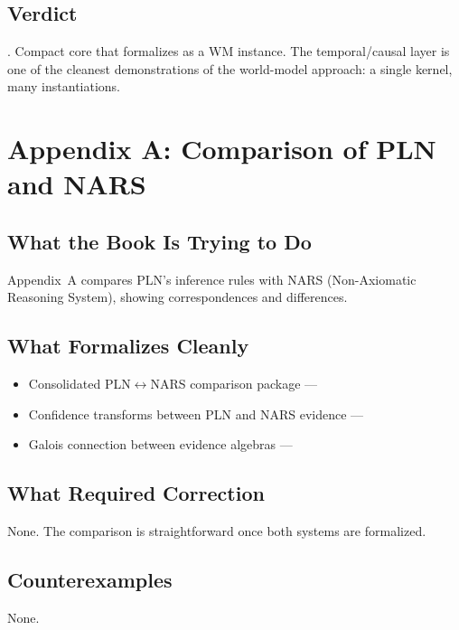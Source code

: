 \documentclass[11pt,openany]{report}
\begin{document}
\section{Verdict}

\verdictClean{}.  Compact core that formalizes as a WM instance.  The
temporal/causal layer is one of the cleanest demonstrations of the
world-model approach: a single kernel, many instantiations.


\chapter{Appendix A: Comparison of PLN and NARS}
\label{ch:review-appA}

\section{What the Book Is Trying to Do}

Appendix~A compares PLN's inference rules with NARS (Non-Axiomatic
Reasoning System), showing correspondences and differences.

\section{What Formalizes Cleanly}

\begin{itemize}
\item Consolidated PLN$\leftrightarrow$NARS comparison package ---
\item Confidence transforms between PLN and NARS evidence ---
\item Galois connection between evidence algebras ---
\end{itemize}

\section{What Required Correction}

None.  The comparison is straightforward once both systems are
formalized.

\section{Counterexamples}

None.
\end{document}
